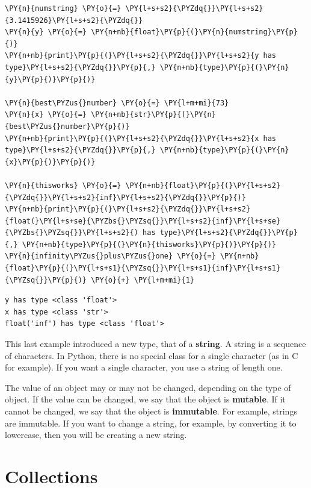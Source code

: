 \begin{Verbatim}[commandchars=\\\{\}]
\PY{n}{numstring} \PY{o}{=} \PY{l+s+s2}{\PYZdq{}}\PY{l+s+s2}{3.1415926}\PY{l+s+s2}{\PYZdq{}}
\PY{n}{y} \PY{o}{=} \PY{n+nb}{float}\PY{p}{(}\PY{n}{numstring}\PY{p}{)}
\PY{n+nb}{print}\PY{p}{(}\PY{l+s+s2}{\PYZdq{}}\PY{l+s+s2}{y has type}\PY{l+s+s2}{\PYZdq{}}\PY{p}{,} \PY{n+nb}{type}\PY{p}{(}\PY{n}{y}\PY{p}{)}\PY{p}{)}

\PY{n}{best\PYZus{}number} \PY{o}{=} \PY{l+m+mi}{73}
\PY{n}{x} \PY{o}{=} \PY{n+nb}{str}\PY{p}{(}\PY{n}{best\PYZus{}number}\PY{p}{)}
\PY{n+nb}{print}\PY{p}{(}\PY{l+s+s2}{\PYZdq{}}\PY{l+s+s2}{x has type}\PY{l+s+s2}{\PYZdq{}}\PY{p}{,} \PY{n+nb}{type}\PY{p}{(}\PY{n}{x}\PY{p}{)}\PY{p}{)}

\PY{n}{thisworks} \PY{o}{=} \PY{n+nb}{float}\PY{p}{(}\PY{l+s+s2}{\PYZdq{}}\PY{l+s+s2}{inf}\PY{l+s+s2}{\PYZdq{}}\PY{p}{)}
\PY{n+nb}{print}\PY{p}{(}\PY{l+s+s2}{\PYZdq{}}\PY{l+s+s2}{float(}\PY{l+s+se}{\PYZbs{}\PYZsq{}}\PY{l+s+s2}{inf}\PY{l+s+se}{\PYZbs{}\PYZsq{}}\PY{l+s+s2}{) has type}\PY{l+s+s2}{\PYZdq{}}\PY{p}{,} \PY{n+nb}{type}\PY{p}{(}\PY{n}{thisworks}\PY{p}{)}\PY{p}{)}
\PY{n}{infinity\PYZus{}plus\PYZus{}one} \PY{o}{=} \PY{n+nb}{float}\PY{p}{(}\PY{l+s+s1}{\PYZsq{}}\PY{l+s+s1}{inf}\PY{l+s+s1}{\PYZsq{}}\PY{p}{)} \PY{o}{+} \PY{l+m+mi}{1}
\end{Verbatim}

\begin{Verbatim}
y has type <class 'float'>
x has type <class 'str'>
float('inf') has type <class 'float'>

\end{Verbatim}


This last example introduced a new type, that of a \textbf{string}.  A string is a sequence of characters.  In Python, there is no special class for a single character (as in C for example).
If you want a single character, you use a string of length one.


The value of an object may or may not be changed, depending on the type of object.
If the value can be changed, we say that the object is \textbf{mutable}.
If it cannot be changed, we say that the object is \textbf{immutable}.
For example, strings are immutable.  If you want to change a string, for example, by converting it to lowercase, then you will be creating a new string.

\section{Collections}


